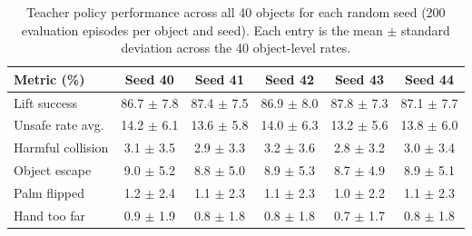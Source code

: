 \begin{table}[H]
  \centering
  \small
  \caption{Teacher policy performance across all 40 objects for each random seed
  (200 evaluation episodes per object and seed). Each entry is the mean
  $\pm$ standard deviation across the 40 object-level rates.}
  \label{tab:seed_reporting}
  \setlength{\tabcolsep}{9pt}
  \renewcommand{\arraystretch}{1.14}
  \begin{tabular}{l|ccccc}
    \toprule
    Metric (\%) & Seed 40 & Seed 41 & Seed 42 & Seed 43 & Seed 44 \\
    \midrule
    Lift success      & 86.7 $\pm$ 7.8 & 87.4 $\pm$ 7.5 & 86.9 $\pm$ 8.0 & 87.8 $\pm$ 7.3 & 87.1 $\pm$ 7.7 \\
    Unsafe rate avg.  & 14.2 $\pm$ 6.1 & 13.6 $\pm$ 5.8 & 14.0 $\pm$ 6.3 & 13.2 $\pm$ 5.6 & 13.8 $\pm$ 6.0 \\
    Harmful collision & 3.1 $\pm$ 3.5 & 2.9 $\pm$ 3.3 & 3.2 $\pm$ 3.6 & 2.8 $\pm$ 3.2 & 3.0 $\pm$ 3.4 \\
    Object escape     & 9.0 $\pm$ 5.2 & 8.8 $\pm$ 5.0 & 8.9 $\pm$ 5.3 & 8.7 $\pm$ 4.9 & 8.9 $\pm$ 5.1 \\
    Palm flipped      & 1.2 $\pm$ 2.4 & 1.1 $\pm$ 2.3 & 1.1 $\pm$ 2.3 & 1.0 $\pm$ 2.2 & 1.1 $\pm$ 2.3 \\
    Hand too far      & 0.9 $\pm$ 1.9 & 0.8 $\pm$ 1.8 & 0.8 $\pm$ 1.8 & 0.7 $\pm$ 1.7 & 0.8 $\pm$ 1.8 \\
    \bottomrule
  \end{tabular}
\end{table}
